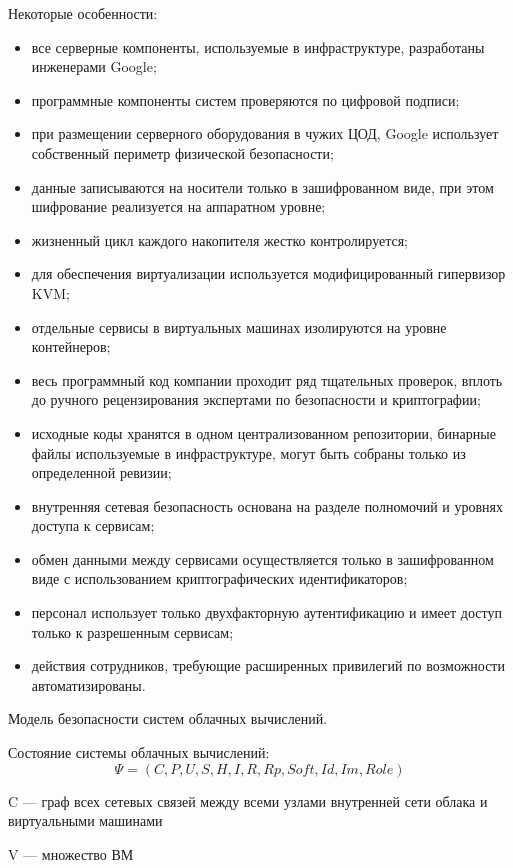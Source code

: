 Некоторые особенности:
\begin{itemize}
  \item все серверные компоненты, используемые в инфраструктуре, разработаны инженерами Google;
  \item программные компоненты систем проверяются по цифровой подписи;
  \item при размещении серверного оборудования в чужих ЦОД, Google использует собственный периметр физической безопасности;
  \item данные записываются на носители только в зашифрованном виде, при этом шифрование реализуется на аппаратном уровне;
  \item жизненный цикл каждого накопителя жестко контролируется;
  \item для обеспечения виртуализации используется модифицированный гипервизор KVM;
  \item отдельные сервисы в виртуальных машинах изолируются на уровне контейнеров;
  \item весь программный код компании проходит ряд тщательных проверок, вплоть до ручного рецензирования экспертами по безопасности и криптографии;
  \item исходные коды хранятся в одном централизованном репозитории, бинарные файлы используемые в инфраструктуре, могут быть собраны только из определенной ревизии;
  \item внутренняя сетевая безопасность основана на разделе полномочий и уровнях доступа к сервисам;
  \item обмен данными между сервисами осуществляется только в зашифрованном виде с использованием криптографических идентификаторов;
  \item персонал использует только двухфакторную аутентификацию и имеет доступ только к разрешенным сервисам;
  \item действия сотрудников, требующие расширенных привилегий по возможности автоматизированы.
\end{itemize}

\iffalse
Модель безопасности систем облачных вычислений.

Состояние системы облачных вычислений:
\begin{equation}
\Psi = (C, P, U, S, H, I, R, Rp, Soft, Id, Im, Role)
\end{equation}

C --- граф всех сетевых связей между всеми узлами внутренней сети облака и
виртуальными машинами

V --- множество ВМ

